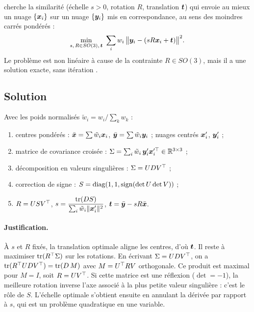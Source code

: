  cherche la similarité (échelle $s > 0$, rotation $R$, translation $\bm{t}$) qui envoie au mieux un nuage $\{\bm{x}_i\}$ sur un nuage $\{\bm{y}_i\}$ mis en correspondance, au sens des moindres carrés pondérés :
\begin{equation}
  \min_{s,\,R \in SO(3),\,\bm{t}} \ \sum_i w_i \,\big\|\bm{y}_i - (s R \bm{x}_i + \bm{t})\big\|^2 .
\end{equation}
Le problème est non linéaire à cause de la contrainte $R \in SO(3)$, mais il a une solution exacte, sans itération \cite{umeyama1991}.

\subsection{Solution}

Avec les poids normalisés $\tilde w_i = w_i / \sum_k w_k$ :
\begin{enumerate}
  \item centres pondérés : $\bar{\bm{x}} = \sum \tilde w_i \bm{x}_i$, $\bar{\bm{y}} = \sum \tilde w_i \bm{y}_i$ ; nuages centrés $\bm{x}'_i$, $\bm{y}'_i$ ;
  \item matrice de covariance croisée : $\Sigma = \sum_i \tilde w_i\, \bm{y}'_i \bm{x}'^{\top}_i \in \mathbb{R}^{3\times3}$ ;
  \item décomposition en valeurs singulières : $\Sigma = U D V^{\top}$ ;
  \item correction de signe : $S = \operatorname{diag}(1, 1, \operatorname{sign}(\det U \det V))$ ;
  \item $R = U S V^{\top}$, \quad $s = \dfrac{\operatorname{tr}(D S)}{\sum_i \tilde w_i \|\bm{x}'_i\|^2}$, \quad $\bm{t} = \bar{\bm{y}} - s R \bar{\bm{x}}$.
\end{enumerate}

\paragraph{Justification.} À $s$ et $R$ fixés, la translation optimale aligne les centres, d'où $\bm{t}$. Il reste à maximiser $\operatorname{tr}(R^{\top} \Sigma)$ sur les rotations. En écrivant $\Sigma = U D V^{\top}$, on a $\operatorname{tr}(R^{\top} U D V^{\top}) = \operatorname{tr}(D\,M)$ avec $M = U^{\top} R V$ orthogonale. Ce produit est maximal pour $M = I$, soit $R = U V^{\top}$. Si cette matrice est une réflexion ($\det = -1$), la meilleure rotation inverse l'axe associé à la plus petite valeur singulière : c'est le rôle de $S$. L'échelle optimale s'obtient ensuite en annulant la dérivée par rapport à $s$, qui est un problème quadratique en une variable.

